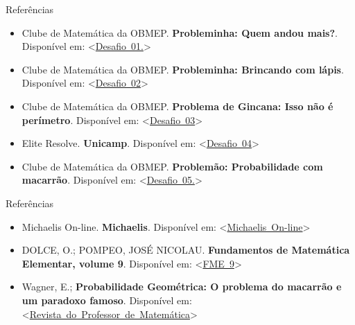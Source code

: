 \documentclass[12pt]{beamer}
\begin{document}
\begin{frame}{Referências}
	\justifying
	\begin{itemize}
		\item Clube de Matemática da OBMEP. \textbf{Probleminha: Quem andou mais?}. Disponível em: <\href{https://clubes.obmep.org.br/blog/problema-quem-andou-mais/}{Desafio\  01.}>
		
		\item Clube de Matemática da OBMEP. \textbf{Probleminha: Brincando com lápis}. Disponível em: <\href{https://clubes.obmep.org.br/blog/probleminha-brincando-com-lapis/}{Desafio\  02}>
		
		\item Clube de Matemática da OBMEP. \textbf{Problema de Gincana: Isso não é perímetro}. Disponível em: <\href{https://clubes.obmep.org.br/blog/problema-de-gincana-isso-nao-e-perimetro/}{Desafio\  03}>
		
		\item Elite Resolve. \textbf{Unicamp}. Disponível em: <\href{https://sisq.elitecampinas.com.br/GabaritoVestibulares/VisualizarQuestao?id_questao_tipo=10200}{Desafio\ 04}>
		
		\item Clube de Matemática da OBMEP. \textbf{Problemão: Probabilidade com macarrão}. Disponível em: <\href{https://clubes.obmep.org.br/blog/problemao-probabilidade-com-macarrao/}{Desafio\  05.}>
	\end{itemize}
\end{frame}

\begin{frame}{Referências}
	\justifying
	\begin{itemize}
		\item Michaelis On-line. \textbf{Michaelis}. Disponível em: <\href{https://michaelis.uol.com.br/}{Michaelis\ On-line}>
		
		\item DOLCE, O.; POMPEO, JOSÉ NICOLAU. \textbf{Fundamentos de Matemática Elementar, volume 9}. Disponível em: <\href{https://barbosadejesu.wordpress.com/wp-content/uploads/2021/09/fundamentos-da-matematica-elementar-9.pdf}{FME\  9}>
		
		\item Wagner, E.; \textbf{Probabilidade Geométrica: O problema do macarrão e um paradoxo famoso}. Disponível em: <\href{https://rpm.org.br/cdrpm/34/6.htm}{Revista\ do\ Professor\ de\ Matem\'atica}>
		
		
	
	\end{itemize}
\end{frame}
\end{document}
